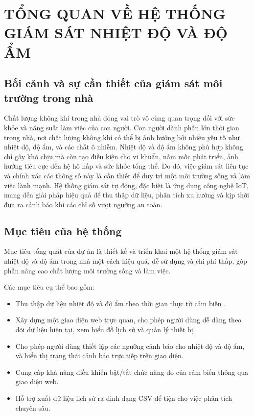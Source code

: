 
\chapter{TỔNG QUAN VỀ HỆ THỐNG GIÁM SÁT NHIỆT ĐỘ VÀ ĐỘ ẨM} %

\label{Chapter1} %


\section{Bối cảnh và sự cần thiết của giám sát môi trường trong nhà}
Chất lượng không khí trong nhà đóng vai trò vô cùng quan trọng đối với sức khỏe và năng suất làm việc của con người. Con người dành phần lớn thời gian trong nhà, nơi chất lượng không khí có thể bị ảnh hưởng bởi nhiều yếu tố như nhiệt độ, độ ẩm, và các chất ô nhiễm. Nhiệt độ và độ ẩm không phù hợp không chỉ gây khó chịu mà còn tạo điều kiện cho vi khuẩn, nấm mốc phát triển, ảnh hưởng tiêu cực đến hệ hô hấp và sức khỏe tổng thể. Do đó, việc giám sát liên tục và chính xác các thông số này là cần thiết để duy trì một môi trường sống và làm việc lành mạnh. Hệ thống giám sát tự động, đặc biệt là ứng dụng công nghệ IoT, mang đến giải pháp hiệu quả để thu thập dữ liệu, phân tích xu hướng và kịp thời đưa ra cảnh báo khi các chỉ số vượt ngưỡng an toàn.

\section{Mục tiêu của hệ thống}
Mục tiêu tổng quát của dự án là thiết kế và triển khai một hệ thống giám sát nhiệt độ và độ ẩm trong nhà một cách hiệu quả, dễ sử dụng và chi phí thấp, góp phần nâng cao chất lượng môi trường sống và làm việc.

Các mục tiêu cụ thể bao gồm:
\begin{itemize}
	\item Thu thập dữ liệu nhiệt độ và độ ẩm theo thời gian thực từ cảm biến .
	\item Xây dựng một giao diện web trực quan, cho phép người dùng dễ dàng theo dõi dữ liệu hiện tại, xem biểu đồ lịch sử và quản lý thiết bị.
	\item Cho phép người dùng thiết lập các ngưỡng cảnh báo cho nhiệt độ và độ ẩm, và hiển thị trạng thái cảnh báo trực tiếp trên giao diện.
	\item Cung cấp khả năng điều khiển bật/tắt chức năng đo của cảm biến thông qua giao diện web.
	\item Hỗ trợ xuất dữ liệu lịch sử ra định dạng CSV để tiện cho việc phân tích chuyên sâu.
\end{itemize}

